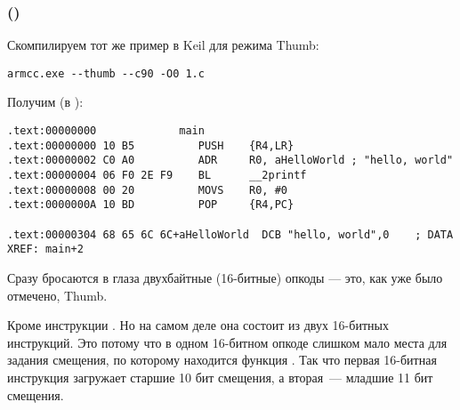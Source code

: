 \subsubsection{\NonOptimizingKeilVI (\ThumbMode)}

Скомпилируем тот же пример в Keil для режима Thumb:

\begin{lstlisting}
armcc.exe --thumb --c90 -O0 1.c 
\end{lstlisting}

Получим (в \IDA):

\begin{lstlisting}[caption=\NonOptimizingKeilVI (\ThumbMode) + \IDA,style=customasmARM]
.text:00000000             main
.text:00000000 10 B5          PUSH    {R4,LR}
.text:00000002 C0 A0          ADR     R0, aHelloWorld ; "hello, world"
.text:00000004 06 F0 2E F9    BL      __2printf
.text:00000008 00 20          MOVS    R0, #0
.text:0000000A 10 BD          POP     {R4,PC}

.text:00000304 68 65 6C 6C+aHelloWorld  DCB "hello, world",0    ; DATA XREF: main+2
\end{lstlisting}

Сразу бросаются в глаза двухбайтные (16-битные) опкоды --- это, как уже было отмечено, Thumb.

Кроме инструкции .
Но на самом деле она состоит из двух 16-битных инструкций.
Это потому что в одном 16-битном опкоде слишком мало места для задания смещения, по которому находится функция \printf.
Так что первая 16-битная инструкция загружает старшие 10 бит смещения, а вторая~--- младшие 11 бит смещения.


